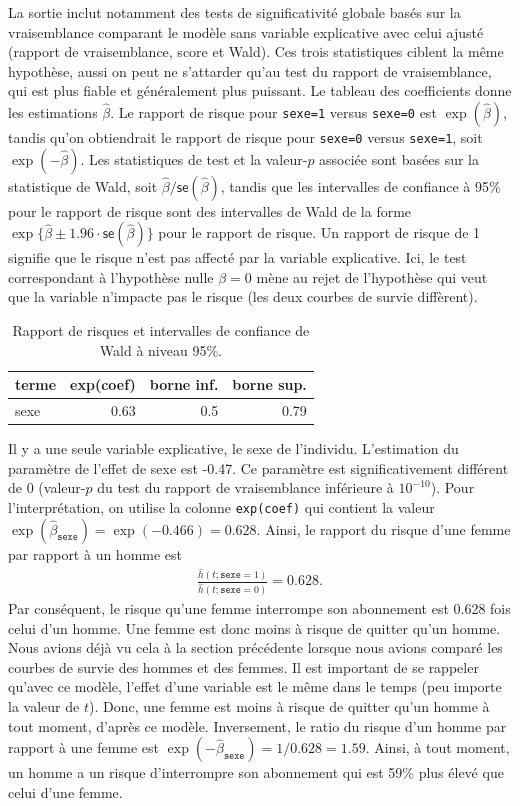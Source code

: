 \documentclass[
  11pt,
  letterpaper,
]{scrbook}
\theoremstyle{definition}
\theoremstyle{remark}
\begin{document}
La sortie inclut notamment des tests de significativité globale basés
sur la vraisemblance comparant le modèle sans variable explicative avec
celui ajusté (rapport de vraisemblance, score et Wald). Ces trois
statistiques ciblent la même hypothèse, aussi on peut ne s'attarder
qu'au test du rapport de vraisemblance, qui est plus fiable et
généralement plus puissant. Le tableau des coefficients donne les
estimations \(\widehat{\beta}\). Le rapport de risque pour
\texttt{sexe=1} versus \texttt{sexe=0} est \(\exp(\widehat{\beta})\),
tandis qu'on obtiendrait le rapport de risque pour \texttt{sexe=0}
versus \texttt{sexe=1}, soit \(\exp(-\widehat{\beta})\). Les
statistiques de test et la valeur-\(p\) associée sont basées sur la
statistique de Wald, soit
\(\widehat{\beta}/\mathsf{se}(\widehat{\beta})\), tandis que les
intervalles de confiance à 95\% pour le rapport de risque sont des
intervalles de Wald de la forme
\(\exp\{\widehat{\beta} \pm 1.96 \cdot \mathsf{se}(\widehat{\beta})\}\)
pour le rapport de risque. Un rapport de risque de 1 signifie que le
risque n'est pas affecté par la variable explicative. Ici, le test
correspondant à l'hypothèse nulle \(\beta=0\) mène au rejet de
l'hypothèse qui veut que la variable n'impacte pas le risque (les deux
courbes de survie diffèrent).

\begin{longtable}[t]{lrrr}

\caption{\label{tbl-cox1}Rapport de risques et intervalles de confiance
de Wald à niveau 95\%.}

\tabularnewline

\toprule
terme & exp(coef) & borne inf. & borne sup.\\
\midrule
sexe & 0.63 & 0.5 & 0.79\\
\bottomrule

\end{longtable}

Il y a une seule variable explicative, le sexe de l'individu.
L'estimation du paramètre de l'effet de sexe est -0.47. Ce paramètre est
significativement différent de \(0\) (valeur-\(p\) du test du rapport de
vraisemblance inférieure à \(10^{-10}\)). Pour l'interprétation, on
utilise la colonne \texttt{exp(coef)} qui contient la valeur
\(\exp(\hat{\beta}_{\texttt{sexe}}) = \exp(-0.466) = 0.628\). Ainsi, le
rapport du risque d'une femme par rapport à un homme est \begin{align*}
 \frac{\hat{h}(t; \texttt{sexe}=1)}{\hat{h}(t; \texttt{sexe}=0)}= 0.628.
\end{align*} Par conséquent, le risque qu'une femme interrompe son
abonnement est 0.628 fois celui d'un homme. Une femme est donc moins à
risque de quitter qu'un homme. Nous avions déjà vu cela à la section
précédente lorsque nous avions comparé les courbes de survie des hommes
et des femmes. Il est important de se rappeler qu'avec ce modèle,
l'effet d'une variable est le même dans le temps (peu importe la valeur
de \(t\)). Donc, une femme est moins à risque de quitter qu'un homme à
tout moment, d'après ce modèle. Inversement, le ratio du risque d'un
homme par rapport à une femme est
\(\exp(-\hat{\beta}_{\texttt{sexe}}) = 1/0.628=1.59\). Ainsi, à tout
moment, un homme a un risque d'interrompre son abonnement qui est 59\%
plus élevé que celui d'une femme.
\end{document}
